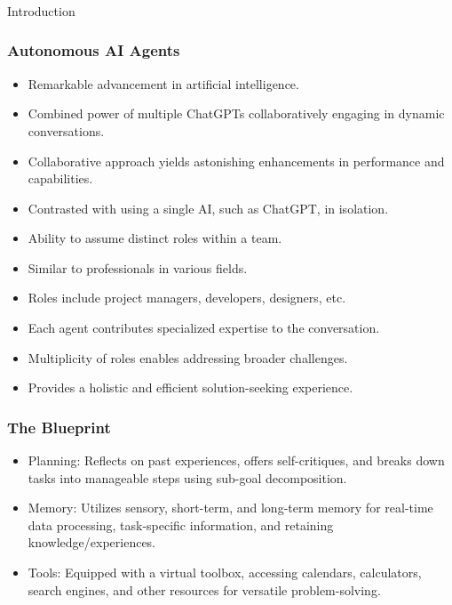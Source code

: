 \begin{frame}[fragile]\frametitle{}
\begin{center}
{\Large Introduction}
\end{center}
\end{frame}

\begin{frame}[fragile]\frametitle{Autonomous AI Agents}
  \begin{itemize}
    \item Remarkable advancement in artificial intelligence.
    \item Combined power of multiple ChatGPTs collaboratively engaging in dynamic conversations.
    \item Collaborative approach yields astonishing enhancements in performance and capabilities.
    \item Contrasted with using a single AI, such as ChatGPT, in isolation.
    \item Ability to assume distinct roles within a team.
    \item Similar to professionals in various fields.
    \item Roles include project managers, developers, designers, etc.
    \item Each agent contributes specialized expertise to the conversation.
    \item Multiplicity of roles enables addressing broader challenges.
    \item Provides a holistic and efficient solution-seeking experience.
  \end{itemize}
\end{frame}

\begin{frame}[fragile]\frametitle{The Blueprint}
  \begin{itemize}
    \item Planning: Reflects on past experiences, offers self-critiques, and breaks down tasks into manageable steps using sub-goal decomposition.
    \item Memory: Utilizes sensory, short-term, and long-term memory for real-time data processing, task-specific information, and retaining knowledge/experiences.
    \item Tools: Equipped with a virtual toolbox, accessing calendars, calculators, search engines, and other resources for versatile problem-solving.
  \end{itemize}
\end{frame}

